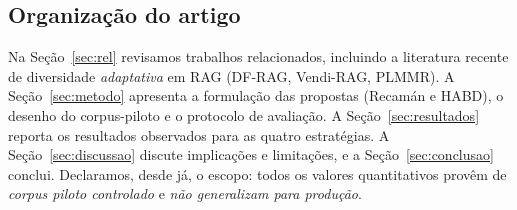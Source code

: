 \subsection{Organização do artigo}

Na Seção~\ref{sec:rel} revisamos trabalhos relacionados, incluindo a literatura
recente de diversidade \emph{adaptativa} em RAG (DF-RAG, Vendi-RAG, PLMMR). A
Seção~\ref{sec:metodo} apresenta a formulação das propostas (Recamán e HABD), o
desenho do corpus-piloto e o protocolo de avaliação. A Seção~\ref{sec:resultados}
reporta os resultados observados para as quatro estratégias. A
Seção~\ref{sec:discussao} discute implicações e limitações, e a
Seção~\ref{sec:conclusao} conclui. Declaramos, desde já, o escopo: todos os
valores quantitativos provêm de \emph{corpus piloto controlado} e \emph{não
generalizam para produção}.
